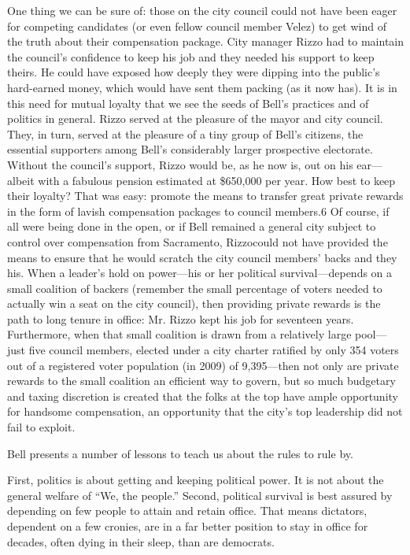 \documentclass[10pt]{article}
\begin{document}
{\large One thing we can be sure of: those on the city council could not have
been eager for competing candidates (or even fellow council member Velez) to get
wind of the truth about their compensation package. City manager Rizzo had to
maintain the council's confidence to keep his job and they needed his support to
keep theirs. He could have exposed how deeply they were dipping into the public's
hard-earned money, which would have sent them packing (as it now has). It is in
this need for mutual loyalty that we see the seeds of Bell's practices and of
politics in general. Rizzo served at the pleasure of the mayor and city council.
They, in turn, served at the pleasure of a tiny group of Bell's citizens, the
essential supporters among Bell's considerably larger prospective electorate.
Without the council's support, Rizzo would be, as he now is, out on his
ear---albeit with a fabulous pension estimated at \$650,000 per year. How best to
keep their loyalty? That was easy: promote the means to transfer great private
rewards in the form of lavish compensation packages to council members.6 Of
course, if all were being done in the open, or if Bell remained a general city
subject to control over compensation from Sacramento, Rizzocould not have
provided the means to ensure that he would scratch the city council members'
backs and they his. When a leader's hold on power---his or her political
survival---depends on a small coalition of backers (remember the small percentage
of voters needed to actually win a seat on the city council), then providing
private rewards is the path to long tenure in office: Mr. Rizzo kept his job for
seventeen years. Furthermore, when that small coalition is drawn from a
relatively large pool---just five council members, elected under a city charter
ratified by only 354 voters out of a registered voter population (in 2009) of
9,395---then not only are private rewards to the small coalition an efficient way
to govern, but so much budgetary and taxing discretion is created that the folks
at the top have ample opportunity for handsome compensation, an opportunity that
the city's top leadership did not fail to exploit.}

{\large Bell presents a number of lessons to teach us about the rules to rule
by.}

{\large First, politics is about getting and keeping political power. It is not
about the general welfare of ``We, the people.'' Second, political survival is
best assured by depending on few people to attain and retain office. That means
dictators, dependent on a few cronies, are in a far better position to stay in
office for decades, often dying in their sleep, than are democrats.}
\end{document}
